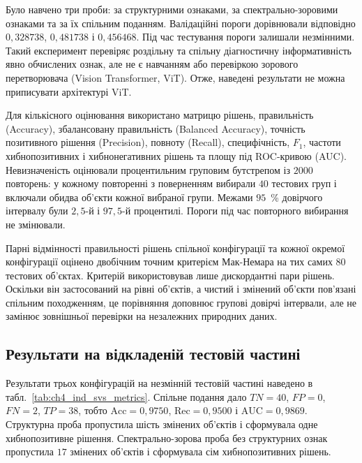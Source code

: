 Було навчено три проби: за структурними ознаками, за спектрально-зоровими ознаками та за їх спільним поданням. Валідаційні пороги дорівнювали відповідно $0{,}328738$, $0{,}481738$ і $0{,}456468$. Під час тестування пороги залишали незмінними. Такий експеримент перевіряє роздільну та спільну діагностичну інформативність явно обчислених ознак, але не є навчанням або перевіркою зорового перетворювача (Vision Transformer, ViT). Отже, наведені результати не можна приписувати архітектурі ViT.

Для кількісного оцінювання використано матрицю рішень, правильність (Accuracy), збалансовану правильність (Balanced Accuracy), точність позитивного рішення (Precision), повноту (Recall), специфічність, $F_1$, частоти хибнопозитивних і хибнонегативних рішень та площу під ROC-кривою (AUC). Невизначеність оцінювали процентильним груповим бутстрепом із $2000$ повторень: у кожному повторенні з поверненням вибирали $40$ тестових груп і включали обидва об'єкти кожної вибраної групи. Межами $95$~\% довірчого інтервалу були $2{,}5$-й і $97{,}5$-й процентилі. Пороги під час повторного вибирання не змінювали.

Парні відмінності правильності рішень спільної конфігурації та кожної окремої конфігурації оцінено двобічним точним критерієм Мак-Немара на тих самих $80$ тестових об'єктах. Критерій використовував лише дискордантні пари рішень. Оскільки він застосований на рівні об'єктів, а чистий і змінений об'єкти пов'язані спільним походженням, це порівняння доповнює групові довірчі інтервали, але не замінює зовнішньої перевірки на незалежних природних даних.

\subsection{Результати на відкладеній тестовій частині}
\label{subsec:ch4_ind_svs_results}

Результати трьох конфігурацій на незмінній тестовій частині наведено в табл.~\ref{tab:ch4_ind_svs_metrics}. Спільне подання дало $TN=40$, $FP=0$, $FN=2$, $TP=38$, тобто $\mathrm{Acc}=0{,}9750$, $\mathrm{Rec}=0{,}9500$ і $\mathrm{AUC}=0{,}9869$. Структурна проба пропустила шість змінених об'єктів і сформувала одне хибнопозитивне рішення. Спектрально-зорова проба без структурних ознак пропустила $17$ змінених об'єктів і сформувала сім хибнопозитивних рішень.

